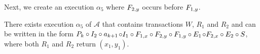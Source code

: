  Next, we create an execution  $\alpha_5$ where 
    $\fragt{F_{2,y}}{\alpha_5}{}$ occurs before  $ \fragt{F_{1,y}}{\alpha_5}{}$. 
\begin{lemma} \label{lem:exec3_alpha4b} 
\sloppy There exists  execution $\alpha_5$  of $\mathcal{A}$ that contains transactions $W$, $R_1$ and $R_2$ and  can be written in the form
$ \finiteprefixA{k-1}{k} \circ \fragt{I_2}{\alpha_5}{}  \circ a_{k+1} $$ \circ \fragt{I_1}{\alpha_5}{}
\circ \fragn{F_{1,x}}{\alpha_5}{x_1} \circ \fragn{F_{2,y}}{\alpha_5}{y_1} \circ  \fragn{F_{1,y}}{\alpha_5}{y_1} \circ \fragn{E_1}{\alpha_5}{x_1, y_1}
$$\circ \fragn{F_{2,x}}{\alpha_5}{x_1} \circ  \fragn{E_2}{\alpha_5}{x_1, y_1}\circ \fragt{S}{\alpha_5}{}$, 
where both $R_1$ and $R_2$ return $(x_1, y_1)$.
\end{lemma}

